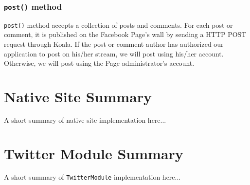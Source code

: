 
\subsubsection{\texttt{post()} method} %
\label{ssub:post()_method}

\texttt{post()} method accepts a collection of posts and comments. For each post or comment, it is published on the Facebook Page's wall by sending a HTTP POST request through Koala. If the post or comment author has authorized our application to post on his/her stream, we will post using his/her account. Otherwise, we will post using the Page administrator's account.  



\section{Native Site Summary} %
\label{sec:native_site_summary}

A short summary of native site implementation here...


\section{Twitter Module Summary} %
\label{sec:twitter_module_summary}

A short summary of \texttt{TwitterModule} implementation here...


